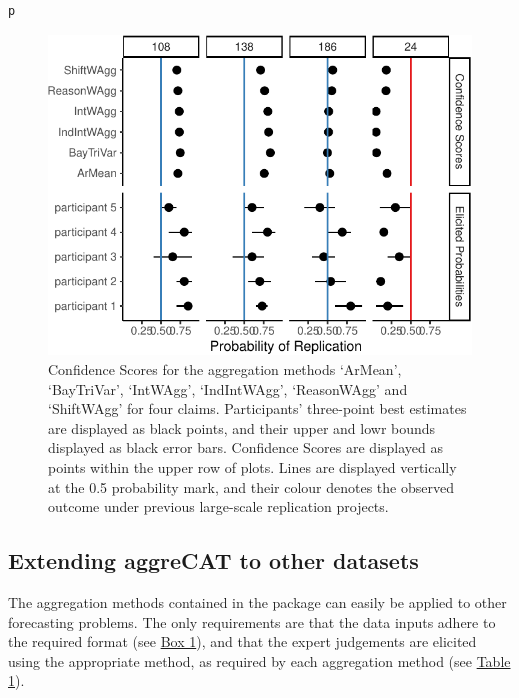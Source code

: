 \documentclass[article]{jss}
\begin{document}
\begin{verbatim}
p
\end{verbatim}

\begin{figure}[H]

{\centering \includegraphics{aggreCAT_files/figure-pdf/fig-aggregation-1.pdf}

}

\caption{\label{fig-aggregation}Confidence Scores for the aggregation
methods `ArMean', `BayTriVar', `IntWAgg', `IndIntWAgg', `ReasonWAgg' and
`ShiftWAgg' for four claims. Participants' three-point best estimates
are displayed as black points, and their upper and lowr bounds displayed
as black error bars. Confidence Scores are displayed as points within
the upper row of plots. Lines are displayed vertically at the 0.5
probability mark, and their colour denotes the observed outcome under
previous large-scale replication projects.}

\end{figure}

\hypertarget{extending-aggrecat-to-other-datasets}{%
\subsection{Extending aggreCAT to other
datasets}\label{extending-aggrecat-to-other-datasets}}

The aggregation methods contained in the  package can
easily be applied to other forecasting problems. The only requirements
are that the data inputs adhere to the required format (see
\protect\hyperlink{aggWorkflow}{Box 1}), and that the expert judgements
are elicited using the appropriate method, as required by each
aggregation method (see \protect\hyperlink{table1}{Table 1}).
\end{document}
